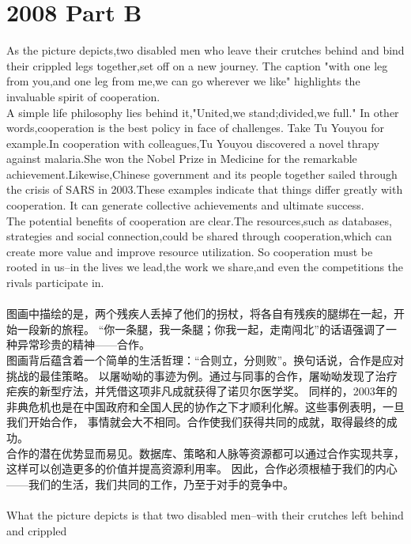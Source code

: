 \documentclass[UTF8]{article}
\begin{document}
    \section*{2008 Part B}
    As the picture depicts,two disabled men who leave their crutches
    behind and bind their crippled legs together,set off on a new journey.
    The caption "with one leg from you,and one leg from me,we can go wherever 
    we like" highlights the invaluable spirit of cooperation.\\
    A simple life philosophy lies behind it,"United,we stand;divided,we full."
    In other words,cooperation is the best policy in face of challenges.
    Take Tu Youyou for example.In cooperation with colleagues,Tu Youyou discovered 
    a novel thrapy against malaria.She won the Nobel Prize in Medicine for the remarkable 
    achievement.Likewise,Chinese government and its people together sailed through the 
    crisis of SARS in 2003.These examples indicate that things differ greatly with cooperation.
    It can generate collective achievements and ultimate success.\\
    The potential benefits of cooperation are clear.The resources,such as databases,
    strategies and social connection,could 
    be shared through cooperation,which can create more value and improve resource utilization.
    So cooperation must be rooted in us--in the lives we lead,the work we share,and even the 
    competitions the rivals participate in.\\
    \\
    图画中描绘的是，两个残疾人丢掉了他们的拐杖，将各自有残疾的腿绑在一起，开始一段新的旅程。
    “你一条腿，我一条腿；你我一起，走南闯北”的话语强调了一种异常珍贵的精神——合作。\\
    图画背后蕴含着一个简单的生活哲理：“合则立，分则败”。换句话说，合作是应对挑战的最佳策略。
    以屠呦呦的事迹为例。通过与同事的合作，屠呦呦发现了治疗疟疾的新型疗法，并凭借这项非凡成就获得了诺贝尔医学奖。
    同样的，2003年的非典危机也是在中国政府和全国人民的协作之下才顺利化解。这些事例表明，一旦我们开始合作，
    事情就会大不相同。合作使我们获得共同的成就，取得最终的成功。\\
    合作的潜在优势显而易见。数据库、策略和人脉等资源都可以通过合作实现共享，这样可以创造更多的价值并提高资源利用率。
    因此，合作必须根植于我们的内心——我们的生活，我们共同的工作，乃至于对手的竞争中。
    \\\\
    What the picture depicts is that two disabled men--with their crutches left behind and crippled 
\end{document}
